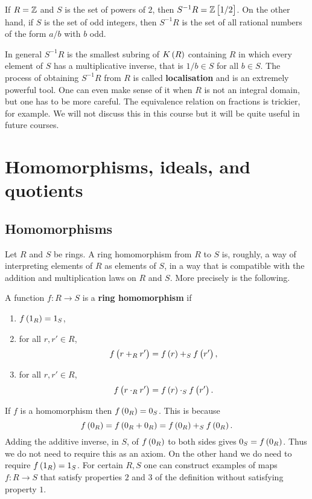 \begin{example*}
If $ R = \mathbb{Z} $ and $ S $ is the set of powers of $ 2 $, then $ S^{-1}R = \Z\sbr{1 / 2} $. On the other hand, if $ S $ is the set of odd integers, then $ S^{-1}R $ is the set of all rational numbers of the form $ a / b $ with $ b $ odd.
\end{example*}

In general $ S^{-1}R $ is the smallest subring of $ K\br{R} $ containing $ R $ in which every element of $ S $ has a multiplicative inverse, that is $ 1 / b \in S $ for all $ b \in S $. The process of obtaining $ S^{-1}R $ from $ R $ is called \textbf{localisation} and is an extremely powerful tool. One can even make sense of it when $ R $ is not an integral domain, but one has to be more careful. The equivalence relation on fractions is trickier, for example. We will not discuss this in this course but it will be quite useful in future courses.

\pagebreak

\section{Homomorphisms, ideals, and quotients}

\subsection{Homomorphisms}

Let $ R $ and $ S $ be rings. A ring homomorphism from $ R $ to $ S $ is, roughly, a way of interpreting elements of $ R $ as elements of $ S $, in a way that is compatible with the addition and multiplication laws on $ R $ and $ S $. More precisely is the following.

\begin{definition}
A function $ f : R \to S $ is a \textbf{ring homomorphism} if
\begin{enumerate}
\item $ f\br{1_R} = 1_S $,
\item for all $ r, r' \in R $,
$$ f\br{r +_R r'} = f\br{r} +_S f\br{r'}, $$
\item for all $ r, r' \in R $,
$$ f\br{r \cdot_R r'} = f\br{r} \cdot_S f\br{r'}. $$
\end{enumerate}
\end{definition}

\begin{note*}
If $ f $ is a homomorphism then $ f\br{0_R} = 0_S $. This is because
$$ f\br{0_R} = f\br{0_R + 0_R} = f\br{0_R} +_S f\br{0_R}. $$
Adding the additive inverse, in $ S $, of $ f\br{0_R} $ to both sides gives $ 0_S = f\br{0_R} $. Thus we do not need to require this as an axiom. On the other hand we do need to require $ f\br{1_R} = 1_S $. For certain $ R, S $ one can construct examples of maps $ f : R \to S $ that satisfy properties $ 2 $ and $ 3 $ of the definition without satisfying property $ 1 $.
\end{note*}

